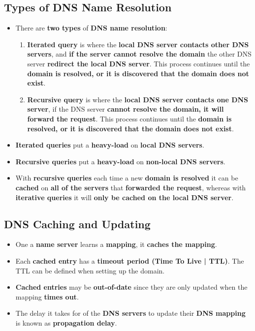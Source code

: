 \documentclass{article}
\begin{document}
    \subsection*{Types of DNS Name Resolution}
    \begin{itemize}
        \item There are \textbf{two types} of \textbf{DNS name resolution}:
        \begin{enumerate}
            \item \textbf{Iterated query} is where the \textbf{local DNS server contacts other DNS servers}, and \textbf{if the server cannot resolve the domain} the other DNS server \textbf{redirect the local DNS server}. This process continues until the \textbf{domain is resolved, or it is discovered that the domain does not exist}.
            \item \textbf{Recursive query} is where the \textbf{local DNS server contacts one DNS server}, if the DNS server \textbf{cannot resolve the domain, it will forward the request}. This process continues until the \textbf{domain is resolved, or it is discovered that the domain does not exist}.
        \end{enumerate}
        \item \textbf{Iterated queries} put a \textbf{heavy-load} on \textbf{local DNS servers}.
        \item \textbf{Recursive queries} put a \textbf{heavy-load} on \textbf{non-local DNS servers}.
        \item With \textbf{recursive queries} each time a new \textbf{domain is resolved} it can be \textbf{cached} on \textbf{all of the servers} that \textbf{forwarded the request}, whereas with \textbf{iterative queries} it will \textbf{only be cached on the local DNS server}.
    \end{itemize}

    \subsection*{DNS Caching and Updating}
    \begin{itemize}
        \item One a \textbf{name server} learns a \textbf{mapping}, it \textbf{caches the mapping}.
        \item Each \textbf{cached entry} has a \textbf{timeout period (Time To Live | TTL)}. The TTL can be defined when setting up the domain.
        \item \textbf{Cached entries} may be \textbf{out-of-date} since they are only updated when the mapping \textbf{times out}.
        \item The delay it takes for of the \textbf{DNS servers} to update their \textbf{DNS mapping} is known as \textbf{propagation delay}.
    \end{itemize}
\end{document}
